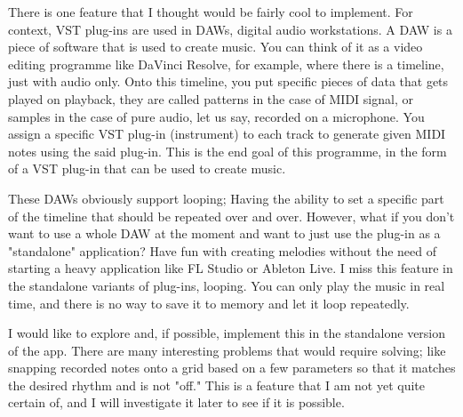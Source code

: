 There is one feature that I thought would be fairly cool to implement. For context, VST plug-ins are used in DAWs, digital audio workstations. A DAW is a piece of software that is used to create music. You can think of it as a video editing programme like DaVinci Resolve, for example, where there is a timeline, just with audio only. Onto this timeline, you put specific pieces of data that gets played on playback, they are called patterns in the case of MIDI signal, or samples in the case of pure audio, let us say, recorded on a microphone. You assign a specific VST plug-in (instrument) to each track to generate given MIDI notes using the said plug-in. This is the end goal of this programme, in the form of a VST plug-in that can be used to create music.

These DAWs obviously support looping; Having the ability to set a specific part of the timeline that should be repeated over and over. However, what if you don't want to use a whole DAW at the moment and want to just use the plug-in as a "standalone" application? Have fun with creating melodies without the need of starting a heavy application like FL Studio or Ableton Live. I miss this feature in the standalone variants of plug-ins, looping. You can only play the music in real time, and there is no way to save it to memory and let it loop repeatedly.

I would like to explore and, if possible, implement this in the standalone version of the app. There are many interesting problems that would require solving; like snapping recorded notes onto a grid based on a few parameters so that it matches the desired rhythm and is not "off." This is a feature that I am not yet quite certain of, and I will investigate it later to see if it is possible.

\endinput